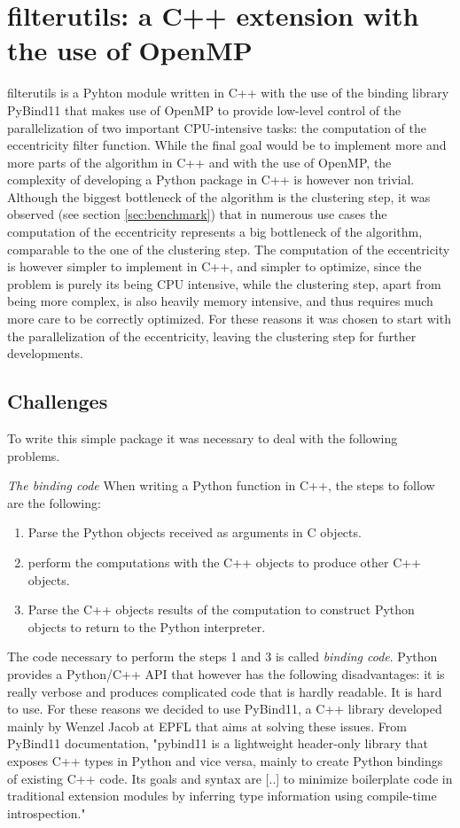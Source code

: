 \section{filterutils: a C++ extension with the use of OpenMP}
filterutils is a Pyhton module written in C++ with the use of the binding library PyBind11 that makes use of OpenMP to provide low-level control of the parallelization of two important CPU-intensive tasks: the computation of the eccentricity filter function. While the final goal would be to implement more and more parts of the algorithm in C++ and with the use of OpenMP, the complexity of developing a Python package in C++ is however non trivial. Although the biggest bottleneck of the algorithm is the clustering step, it was observed (see section \ref{sec:benchmark}) that in numerous use cases the computation of the eccentricity represents a big bottleneck of the algorithm, comparable to the one of the clustering step. The computation of the eccentricity is however simpler to implement in C++, and simpler to optimize, since the problem is purely its being CPU intensive, while the clustering step, apart from being more complex, is also heavily memory intensive, and thus requires much more care to be correctly optimized. For these reasons it was chosen to start with the parallelization of the eccentricity, leaving the clustering step for further developments.

\subsection{Challenges} 
To write this simple package it was necessary to deal with the following problems. 

\textit{The binding code} When writing a Python function in C++, the steps to follow are the following:
\begin{enumerate}
	\item Parse the Python objects received as arguments in C objects.
	\item perform the computations with the C++ objects to produce other C++ objects.
	\item Parse the C++ objects results of the computation to construct Python objects to return to the Python interpreter.
\end{enumerate}
The code necessary to perform the steps 1 and 3 is called \textit{binding code}. Python provides a Python/C++ API that however has the following disadvantages: it is really verbose and produces complicated code that is hardly readable. It is hard to use. For these reasons we decided to use PyBind11, a C++ library developed mainly by Wenzel Jacob at EPFL that aims at solving these issues. From PyBind11 documentation, "pybind11 is a lightweight header-only library that exposes C++ types in Python and vice versa, mainly to create Python bindings of existing C++ code. Its goals and syntax are [..] to minimize boilerplate code in traditional extension modules by inferring type information using compile-time introspection."

